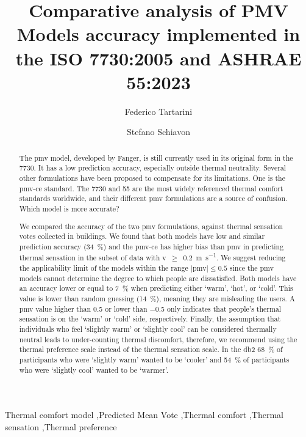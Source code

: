 \begin{frontmatter}

    \title{Comparative analysis of PMV Models accuracy implemented in the ISO 7730:2005 and ASHRAE 55:2023}

    \author[label1]{Federico Tartarini}
    \author[label3]{Stefano Schiavon}

    \address[label1]{The University of Sydney, Sydney, AU}
    \address[label3]{Center for the Built Environment, University of California, Berkeley, CA, USA}


    \begin{abstract}
        The \ac{pmv} model, developed by Fanger, is still currently used in its original form in the \gls{7730}.
        It has a low prediction accuracy, especially outside thermal neutrality.
        Several other formulations have been proposed to compensate for its limitations. 
        One is the \ac{pmv-ce} standard.
        The \gls{7730} and \gls{55} are the most widely referenced thermal comfort standards worldwide, and their different \ac{pmv} formulations are a source of confusion.
        Which model is more accurate?

        We compared the accuracy of the two \ac{pmv} formulations, against  thermal sensation votes collected in buildings.
        We found that both models have low and similar prediction accuracy (\qty{34}{\percent}) and the \ac{pmv-ce} has higher bias than \ac{pmv} in predicting thermal sensation in the subset of data with \ac{v}~$\geq$~\qty{0.2}{\m\per\s}.
        We suggest reducing the applicability limit of the models within the range $\mid$\ac{pmv}$\mid \leq 0.5$ since the \ac{pmv} models cannot determine the degree to which people are dissatisfied. 
        Both models have an accuracy lower or equal to \qty{7}{\percent} when predicting either `warm', `hot', or `cold'. 
        This value is lower than random guessing (\qty{14}{\percent}), meaning they are misleading the users.
        A \ac{pmv} value higher than \num{.5} or lower than \num{-.5} only indicates that people's thermal sensation is on the `warm' or `cold' side, respectively.
        Finally, the assumption that individuals who feel `slightly warm' or `slightly cool' can be considered thermally neutral leads to under-counting thermal discomfort, therefore, we recommend using the thermal preference scale instead of the thermal sensation scale. 
        In the \ac{db2} \qty{68}{\percent} of participants who were `slightly warm' wanted to be `cooler' and \qty{54}{\percent} of participants who were `slightly cool' wanted to be `warmer'.
    \end{abstract}

    \begin{keyword}
        Thermal comfort model \sep Predicted Mean Vote \sep Thermal comfort \sep Thermal sensation \sep Thermal preference
    \end{keyword}

\end{frontmatter}
